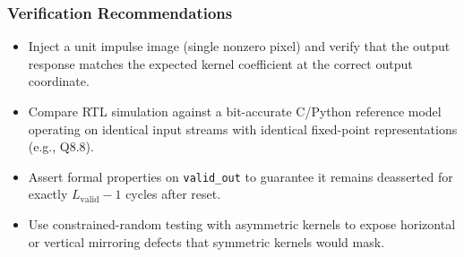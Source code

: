\documentclass[11pt,a4paper]{report}
\begin{document}
\subsubsection{Verification Recommendations}

\begin{itemize}[leftmargin=2em]
    \item Inject a unit impulse image (single nonzero pixel) and verify that the output response matches the expected kernel coefficient at the correct output coordinate.

    \item Compare RTL simulation against a bit-accurate C/Python reference model operating on identical input streams with identical fixed-point representations (e.g., Q8.8).

    \item Assert formal properties on \texttt{valid\_out} to guarantee it remains deasserted for exactly $L_{\mathrm{valid}} - 1$ cycles after reset.

    \item Use constrained-random testing with asymmetric kernels to expose horizontal or vertical mirroring defects that symmetric kernels would mask.
\end{itemize}
\end{document}
